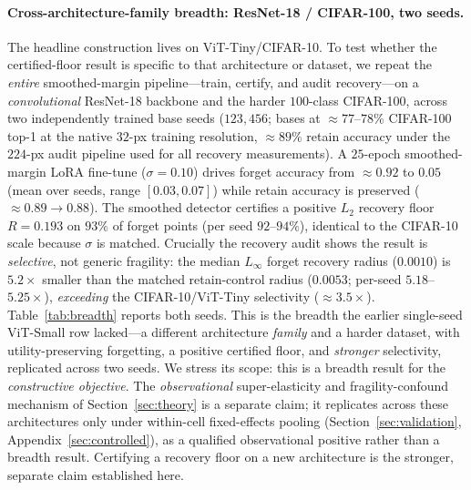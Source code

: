 \documentclass[11pt]{article}
\begin{document}
\paragraph{Cross-architecture-family breadth: ResNet-18 / CIFAR-100, two seeds.}
The headline construction lives on ViT-Tiny/CIFAR-10. To test whether the
certified-floor result is specific to that architecture or dataset, we repeat the
\emph{entire} smoothed-margin pipeline---train, certify, and audit recovery---on a
\emph{convolutional} ResNet-18 backbone and the harder $100$-class CIFAR-100,
across two independently trained base seeds ($123,456$; bases at
$\approx\!77$--$78\%$ CIFAR-100 top-1 at the native $32$-px training resolution,
$\approx\!89\%$ retain accuracy under the $224$-px audit pipeline used for all
recovery measurements). A $25$-epoch smoothed-margin LoRA fine-tune
($\sigma=0.10$) drives forget accuracy from $\approx\!0.92$ to $0.05$ (mean over
seeds, range $[0.03,0.07]$) while retain accuracy is preserved
($\approx\!0.89\!\to\!0.88$). The smoothed detector certifies a positive $L_2$
recovery floor $R=0.193$ on $93\%$ of forget points (per seed $92$--$94\%$),
identical to the CIFAR-10 scale because $\sigma$ is matched. Crucially the
recovery audit shows the result is \emph{selective}, not generic fragility: the
median $L_\infty$ forget recovery radius ($0.0010$) is $5.2\times$ smaller than
the matched retain-control radius ($0.0053$; per-seed $5.18$--$5.25\times$),
\emph{exceeding} the CIFAR-10/ViT-Tiny selectivity ($\approx\!3.5\times$).
Table~\ref{tab:breadth} reports both seeds. This is the breadth the earlier
single-seed ViT-Small row lacked---a different architecture \emph{family} and a
harder dataset, with utility-preserving forgetting, a positive certified floor,
and \emph{stronger} selectivity, replicated across two seeds. We stress its
scope: this is a breadth result for the \emph{constructive objective}. The
\emph{observational} super-elasticity and fragility-confound mechanism of
Section~\ref{sec:theory} is a separate claim; it replicates across these
architectures only under within-cell fixed-effects pooling
(Section~\ref{sec:validation}, Appendix~\ref{sec:controlled}), as a qualified
observational positive rather than a breadth result. Certifying a recovery floor
on a new architecture is the stronger, separate claim established here.
\end{document}
